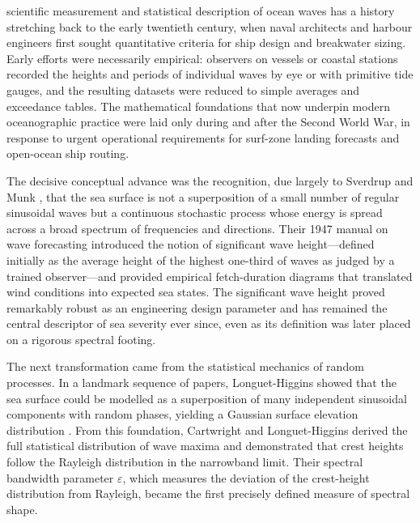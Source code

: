 \documentclass[journal]{IEEEtran}
\begin{document}
     scientific measurement and statistical
    description of ocean waves has a history stretching back to the early
    twentieth century, when naval architects and harbour engineers
    first sought quantitative criteria for ship design and breakwater
    sizing.
    Early efforts were necessarily empirical: observers on vessels or coastal
    stations recorded the heights and periods of individual waves by eye or
    with primitive tide gauges, and the resulting datasets were reduced to
    simple averages and exceedance tables.
    The mathematical foundations that now underpin modern oceanographic
    practice were laid only during and after the Second World War, in
    response to urgent operational requirements for surf-zone landing
    forecasts and open-ocean ship routing.

    The decisive conceptual advance was the recognition, due largely to
    Sverdrup and Munk \cite{Sverdrup1947}, that the sea surface is not a
    superposition of a small number of regular sinusoidal waves but a
    continuous stochastic process whose energy is spread across a broad
    spectrum of frequencies and directions.
    Their 1947 manual on wave forecasting introduced the notion of
    significant wave height---defined initially as the average height of the
    highest one-third of waves as judged by a trained observer---and
    provided empirical fetch-duration diagrams that translated wind conditions
    into expected sea states.
    The significant wave height proved remarkably robust as an engineering
    design parameter and has remained the central descriptor of sea severity
    ever since, even as its definition was later placed on a rigorous
    spectral footing.

    The next transformation came from the statistical mechanics of random
    processes.
    In a landmark sequence of papers, Longuet-Higgins showed that the
    sea surface could be modelled as a superposition of many independent
    sinusoidal components with random phases, yielding a Gaussian surface
    elevation distribution \cite{LonguetHiggins1952}.
    From this foundation, Cartwright and Longuet-Higgins \cite{Cartwright1956}
    derived the full statistical distribution of wave maxima and demonstrated
    that crest heights follow the Rayleigh distribution in the narrowband limit.
    Their spectral bandwidth parameter $\varepsilon$, which measures the
    deviation of the crest-height distribution from Rayleigh, became the
    first precisely defined measure of spectral shape.
\end{document}
